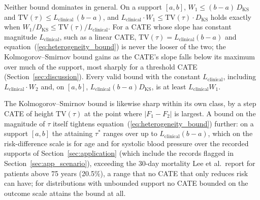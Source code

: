 \documentclass[AMA,Times1COL]{WileyNJDv5}
\begin{document}
Neither bound dominates in general. On a support $[a, b]$, $W_1 \leq (b - a)\,D_{\text{KS}}$ and $\mathrm{TV}(\tau) \leq L_{\text{clinical}}\,(b - a)$, and $L_{\text{clinical}} \cdot W_1 \leq \mathrm{TV}(\tau) \cdot D_{\text{KS}}$ holds exactly when $W_1 / D_{\text{KS}} \leq \mathrm{TV}(\tau) / L_{\text{clinical}}$. For a CATE whose slope has constant magnitude $L_{\text{clinical}}$, such as a linear CATE, $\mathrm{TV}(\tau) = L_{\text{clinical}}(b - a)$ and equation~(\ref{eq:heterogeneity_bound}) is never the looser of the two; the Kolmogorov--Smirnov bound gains as the CATE's slope falls below its maximum over much of the support, most sharply for a threshold CATE (Section~\ref{sec:discussion}). Every valid bound with the constant $L_{\text{clinical}}$, including $L_{\text{clinical}} \cdot W_2$ and, on $[a, b]$, $L_{\text{clinical}} (b - a) D_{\text{KS}}$, is at least $L_{\text{clinical}} W_1$.%

The Kolmogorov--Smirnov bound is likewise sharp within its own class, by a step CATE of height $\mathrm{TV}(\tau)$ at the point where $|F_1 - F_2|$ is largest. A bound on the magnitude of $\tau$ itself tightens equation~(\ref{eq:heterogeneity_bound}) further: on a support $[a, b]$ the attaining $\tau^*$ ranges over up to $L_{\text{clinical}} (b - a)$, which on the risk-difference scale is  for age and  for systolic blood pressure over the recorded supports of Section~\ref{sec:application} (which include the records flagged in Section~\ref{sec:app_scenario}), exceeding the 30-day mortality Lee et al.\ report for patients above 75 years (20.5\%\cite{lee1995}), a range that no CATE that only reduces risk can have; for distributions with unbounded support no CATE bounded on the outcome scale attains the bound at all.
\end{document}

